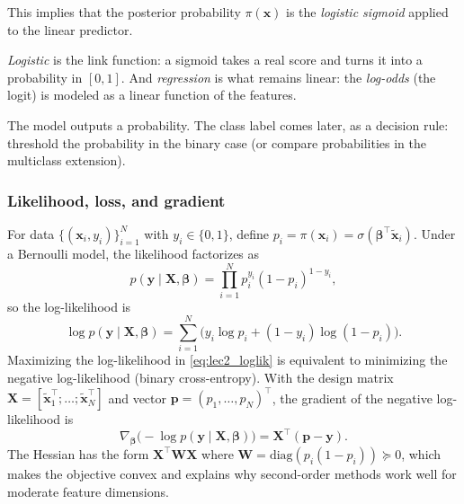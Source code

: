 This implies that the posterior probability \(\pi(\mathbf{x})\) is the \emph{logistic sigmoid} applied to the linear predictor.

\begin{tcolorbox}[summarybox, title={Author's note: why ``logistic'' and why ``regression''?}]
\emph{Logistic} is the link function: a sigmoid takes a real score and turns it into a probability in \([0,1]\). And \emph{regression} is what remains linear: the \emph{log\hyp{}odds} (the logit) is modeled as a linear function of the features.

The model outputs a probability. The class label comes later, as a decision rule: threshold the probability in the binary case (or compare probabilities in the multiclass extension).
\end{tcolorbox}

\subsubsection{Likelihood, loss, and gradient}\label{sec:lec2_logistic_likelihood}
For data \(\{(\mathbf{x}_i, y_i)\}_{i=1}^N\) with \(y_i\in\{0,1\}\), define \(p_i=\pi(\mathbf{x}_i)=\sigma(\boldsymbol{\beta}^\top\tilde{\mathbf{x}}_i)\).
Under a Bernoulli model, the likelihood factorizes as
\begin{equation}
    p(\mathbf{y}\mid \mathbf{X},\boldsymbol{\beta})=\prod_{i=1}^N p_i^{y_i}(1-p_i)^{1-y_i},
    \label{eq:lec2_bernoulli_likelihood}
\end{equation}
so the log\hyp{}likelihood is
\begin{equation}
    \log p(\mathbf{y}\mid \mathbf{X},\boldsymbol{\beta})
    =\sum_{i=1}^N \Big(y_i\log p_i + (1-y_i)\log(1-p_i)\Big).
    \label{eq:lec2_loglik}
\end{equation}
Maximizing the log\hyp{}likelihood in \eqref{eq:lec2_loglik} is equivalent to minimizing the negative log\hyp{}likelihood (binary cross\hyp{}entropy). With the design matrix \(\mathbf{X}=[\tilde{\mathbf{x}}_1^\top;\ldots;\tilde{\mathbf{x}}_N^\top]\) and vector \(\mathbf{p}=(p_1,\ldots, p_N)^\top\), the gradient of the negative log\hyp{}likelihood is
\begin{equation}
    \nabla_{\boldsymbol{\beta}}\Big(-\log p(\mathbf{y}\mid \mathbf{X},\boldsymbol{\beta})\Big)
    =\mathbf{X}^\top(\mathbf{p}-\mathbf{y}).
    \label{eq:lec2_logistic_grad}
\end{equation}
The Hessian has the form \(\mathbf{X}^\top \mathbf{W} \mathbf{X}\) where \(\mathbf{W}=\mathrm{diag}(p_i(1-p_i))\succeq 0\), which makes the objective convex and explains why second-order methods work well for moderate feature dimensions.

